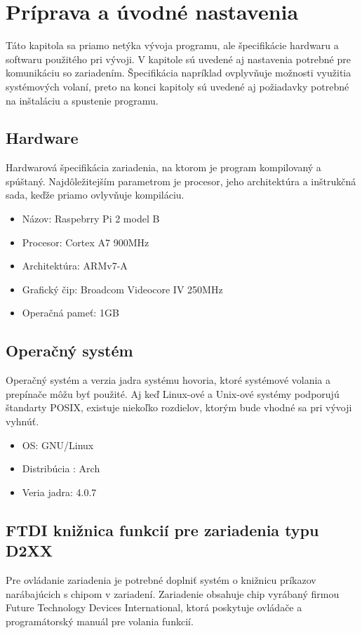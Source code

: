 \def\mfdriver{http://www.ftdichip.com/Drivers/D2XX.htm}
\def\mfinstall{http://www.ftdichip.com/Drivers/D2XX/Linux/ReadMe-linux.txt}

\chapter{Príprava a úvodné nastavenia}

\label{kap:priprava} %

Táto kapitola sa priamo netýka vývoja programu, ale špecifikácie hardwaru a softwaru použitého pri
vývoji. V kapitole sú uvedené aj nastavenia potrebné pre komunikáciu so zariadením. Špecifikácia
napríklad ovplyvňuje možnosti využitia systémových volaní, preto na konci kapitoly sú uvedené aj
požiadavky potrebné na inštaláciu a spustenie programu.


\section{Hardware}
Hardwarová špecifikácia zariadenia, na ktorom je program kompilovaný a spúštaný. Najdôležitejším 
parametrom je  procesor, jeho architektúra a inštrukčná sada, keďže priamo ovlyvňuje kompiláciu.
\begin{itemize}
\item  Názov: Raspebrry Pi 2 model B
\item  Procesor: Cortex A7 900MHz
\item  Architektúra: ARMv7-A
\item  Grafický čip: Broadcom Videocore IV 250MHz
\item  Operačná pameť: 1GB
\end{itemize}


\section{Operačný systém}
Operačný systém a verzia jadra systému hovoria, ktoré systémové volania a prepínače môžu byť použité. 
Aj keď Linux-ové a Unix-ové systémy podporujú štandarty POSIX, existuje niekoľko rozdielov, ktorým bude
vhodné sa pri vývoji vyhnúť.
\begin{itemize}
\item OS: GNU/Linux
\item Distribúcia : Arch
\item Veria jadra: 4.0.7
\end{itemize}


\section{FTDI knižnica funkcií pre zariadenia typu D2XX }
Pre ovládanie zariadenia je potrebné doplniť systém o knižnicu príkazov narábajúcich s chipom v zariadení. 
Zariadenie obsahuje chip vyrábaný firmou Future Technology Devices International, ktorá poskytuje ovládače 
a programátorský manuál pre volania funkcií. 

